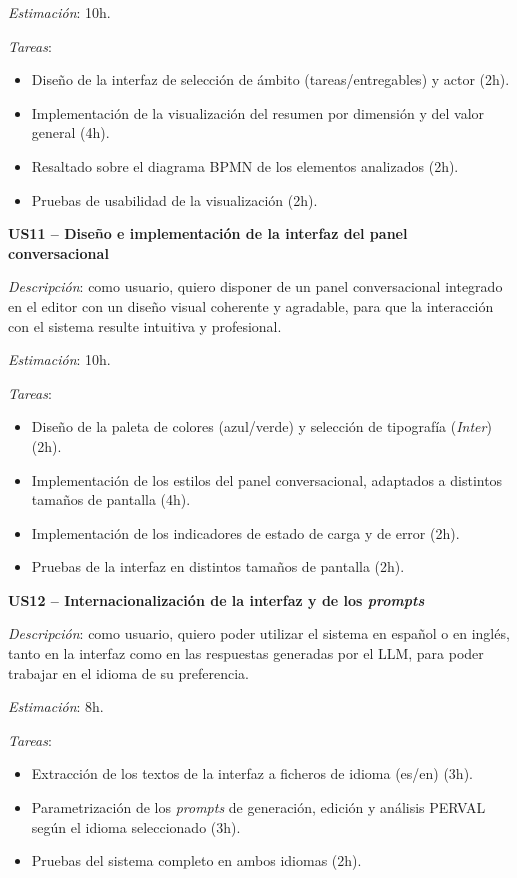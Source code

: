 {\textit{Estimación}: 10h.

\textit{Tareas}:
\begin{itemize}
    \item Diseño de la interfaz de selección de ámbito (tareas/entregables) y actor (2h).
    \item Implementación de la visualización del resumen por dimensión y del valor general (4h).
    \item Resaltado sobre el diagrama BPMN de los elementos analizados (2h).
    \item Pruebas de usabilidad de la visualización (2h).
\end{itemize}

\textbf{US11 -- Diseño e implementación de la interfaz del panel conversacional}

\textit{Descripción}: como usuario, quiero disponer de un panel conversacional integrado en el editor con un diseño visual coherente y agradable, para que la interacción con el sistema resulte intuitiva y profesional.

\textit{Estimación}: 10h.

\textit{Tareas}:
\begin{itemize}
    \item Diseño de la paleta de colores (azul/verde) y selección de tipografía (\textit{Inter}) (2h).
    \item Implementación de los estilos del panel conversacional, adaptados a distintos tamaños de pantalla (4h).
    \item Implementación de los indicadores de estado de carga y de error (2h).
    \item Pruebas de la interfaz en distintos tamaños de pantalla (2h).
\end{itemize}

\textbf{US12 -- Internacionalización de la interfaz y de los \textit{prompts}}

\textit{Descripción}: como usuario, quiero poder utilizar el sistema en español o en inglés, tanto en la interfaz como en las respuestas generadas por el LLM, para poder trabajar en el idioma de su preferencia.

\textit{Estimación}: 8h.

\textit{Tareas}:
\begin{itemize}
    \item Extracción de los textos de la interfaz a ficheros de idioma (es/en) (3h).
    \item Parametrización de los \textit{prompts} de generación, edición y análisis PERVAL según el idioma seleccionado (3h).
    \item Pruebas del sistema completo en ambos idiomas (2h).
\end{itemize}

}

